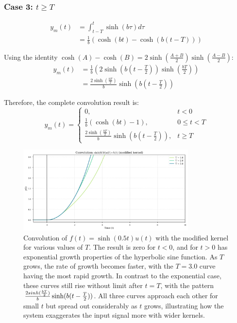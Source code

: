 \documentclass{article}
\begin{document}
	\subsubsection{Case 3: $t \geq T$}
	\begin{align}
		y_m(t) &= \int_{t-T}^{t} \sinh(b\tau) d\tau \\
		&= \frac{1}{b}(\cosh(bt) - \cosh(b(t-T)))
	\end{align}
	
	Using the identity $\cosh(A) - \cosh(B) = 2\sinh(\frac{A+B}{2})\sinh(\frac{A-B}{2})$:
	\begin{align}
		y_m(t) &= \frac{1}{b}(2\sinh(b(t-\frac{T}{2}))\sinh(\frac{bT}{2})) \\
		&= \frac{2\sinh(\frac{bT}{2})}{b}\sinh(b(t-\frac{T}{2}))
	\end{align}
	
	Therefore, the complete convolution result is:
	\begin{equation}
		y_m(t) = 
		\begin{cases} 
			0, & t < 0 \\
			\frac{1}{b}(\cosh(bt) - 1), & 0 \leq t < T \\
			\frac{2\sinh(\frac{bT}{2})}{b}\sinh(b(t-\frac{T}{2})), & t \geq T
		\end{cases}
	\end{equation}
	
	\begin{figure}[htbp]
		\centering
		\includegraphics[width=0.8\textwidth]{figs/hyper_modified_convolution.png}
		\caption{Convolution of $f(t) = \sinh(0.5t)u(t)$ with the modified kernel for various values of $T$. The result is zero for $t < 0$, and for $t > 0$ has exponential growth properties of the hyperbolic sine function. As $T$ grows, the rate of growth becomes faster, with the $T = 3.0$ curve having the most rapid growth. In contrast to the exponential case, these curves still rise without limit after $t = T$, with the pattern $\frac{2\\sinh(\frac{bT}{2})}{b}\sinh(b(t-\frac{T}{2}))$. All three curves approach each other for small $t$ but spread out considerably as $t$ grows, illustrating how the system exaggerates the input signal more with wider kernels.}
		\label{fig:hyper_modified_convolution}
	\end{figure}
	
\end{document}
